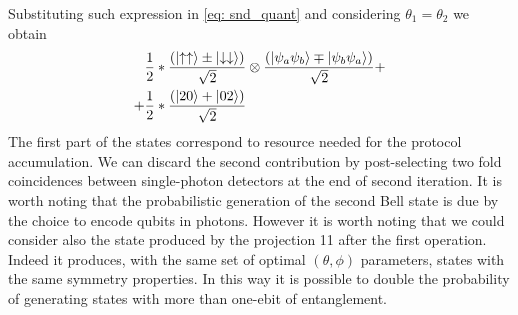 \documentclass[
	aps, pra,
	superscriptaddress, twocolumn,
	floatfix,
	10pt
]{revtex4-1}
\newcommand{\parTitle}[1]{\noindent{\color{Mahogany}(\emph{#1})}}
\newcommand{\calH}{{\mathcal{H}}}
\renewcommand{\parTitle}[1]{}
\begin{document}
Substituting such expression in \cref{eq: snd_quant} and considering $\theta_1 = \theta_2$ we obtain 
\begin{align}
\frac{1}{2}& * \frac{\left( \ket{\uparrow \uparrow} \pm
\ket{\downarrow \downarrow}\right) }{\sqrt{2}}\otimes \frac{\left( \ket{\psi_a \psi_b} \mp
\ket{\psi_b \psi_a}\right) }{\sqrt{2}} +\notag\\
+\frac{1}{2}& *\frac{\left( \ket{20} +
\ket{02}\right) }{\sqrt{2}}
\end{align}
The first part of the states correspond to resource needed for the protocol accumulation. We can discard the second contribution by post-selecting two fold coincidences between single-photon detectors at the end of second iteration. It is worth noting that the probabilistic generation of the second Bell state is due by the choice to encode qubits in photons. However it is worth noting that we could consider also the state  produced by the projection 11 after the first operation. Indeed it produces, with the same set of optimal $(\theta, \phi)$ parameters, states with the same symmetry properties. In this way it is possible to double the probability of generating states with more than one-ebit of entanglement.

\appendix



\end{document}
